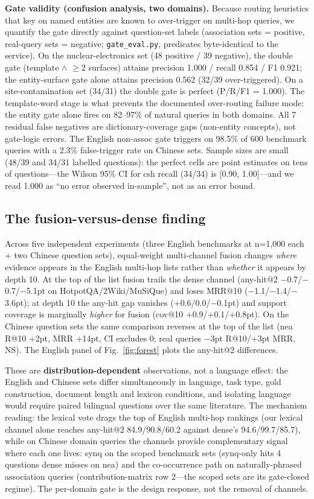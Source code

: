 \documentclass[sigconf,nonacm]{acmart}
\begin{document}
\textbf{Gate validity (confusion analysis, two domains).} Because routing
heuristics that key on named entities are known to over-trigger on multi-hop
queries, we quantify the gate directly against question-set labels
(association sets = positive, real-query sets = negative;
\texttt{gate\_eval.py}, predicates byte-identical to the service). On the
nuclear-electronics set (48 positive / 39 negative), the double gate
(template $\wedge$ $\geq$2 surfaces) attains precision 1.000 / recall 0.854 /
F1 0.921; the entity-surface gate alone attains precision 0.562 (32/39
over-triggered). On a site-contamination set (34/31) the double gate is
perfect (P/R/F1 = 1.000). The template-word stage is what prevents the
documented over-routing failure mode: the entity gate alone fires on
82--97\% of natural queries in both domains. All 7 residual false negatives
are dictionary-coverage gaps (non-entity concepts), not gate-logic errors.
The English non-assoc gate triggers on 98.5\% of 600 benchmark queries
with a 2.3\% false-trigger rate on Chinese sets. Sample sizes are small (48/39 and 34/31 labelled
questions): the perfect cells are point estimates on tens of
questions---the Wilson 95\% CI for csh recall (34/34) is [0.90, 1.00]---and
we read 1.000 as ``no error observed in-sample'', not as an error bound.

\subsection{The fusion-versus-dense finding}

Across five independent experiments (three English benchmarks at n=1{,}000
each + two Chinese question sets), equal-weight multi-channel fusion
changes \emph{where} evidence appears in the English multi-hop lists
rather than \emph{whether} it appears by depth 10. At the top of the
list fusion trails the dense channel (any-hit@2
$-$0.7/$-$0.7/$-$5.1pt on HotpotQA/2Wiki/MuSiQue) and loses MRR@10
($-$1.1/$-$1.4/$-$3.6pt); at depth 10 the any-hit gap vanishes
(+0.6/0.0/$-$0.1pt) and support coverage is marginally \emph{higher}
for fusion (cov@10 +0.9/+0.1/+0.8pt). On the Chinese question sets the
same comparison reverses at the top of the list (nea R@10 +2pt, MRR
+14pt, CI excludes 0; real queries $-$3pt R@10/+3pt MRR, NS). The
English panel of Fig.~\ref{fig:forest} plots the any-hit@2
differences.

These are \textbf{distribution-dependent} observations, not a language
effect: the English and Chinese sets differ simultaneously in language,
task type, gold construction, document length and lexicon conditions,
and isolating language would require paired bilingual questions over
the same literature. The mechanism reading: the lexical vote drags the
top of English multi-hop rankings (our lexical channel alone reaches
any-hit@2 84.9/90.8/60.2 against dense's 94.6/99.7/85.7), while on
Chinese domain queries the channels provide complementary signal where
each one lives: synq on the scoped benchmark sets (synq-only hits 4
questions dense misses on nea) and the co-occurrence path on
naturally-phrased association queries (contribution-matrix row 2---the
scoped sets are its gate-closed regime). The per-domain gate is the
design response, not the removal of channels.
\end{document}
